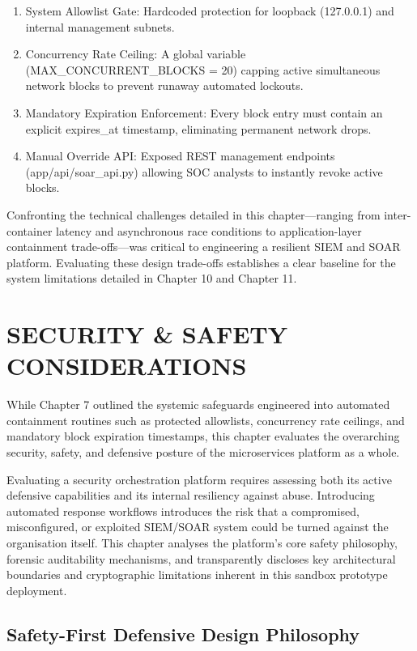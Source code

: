 \begin{enumerate}
  \item System Allowlist Gate: Hardcoded protection for loopback (127.0.0.1) and internal management subnets.
  \item Concurrency Rate Ceiling: A global variable (MAX\_CONCURRENT\_BLOCKS = 20) capping active simultaneous network blocks to prevent runaway automated lockouts.
  \item Mandatory Expiration Enforcement: Every block entry must contain an explicit expires\_at timestamp, eliminating permanent network drops.
  \item Manual Override API: Exposed REST management endpoints (app/api/soar\_api.py) allowing SOC analysts to instantly revoke active blocks.
\end{enumerate}

Confronting the technical challenges detailed in this chapter—ranging from inter-container latency and asynchronous race conditions to application-layer containment trade-offs—was critical to engineering a resilient SIEM and SOAR platform. Evaluating these design trade-offs establishes a clear baseline for the system limitations detailed in Chapter 10 and Chapter 11.

\newpage
\chapter{SECURITY \& SAFETY CONSIDERATIONS}

While Chapter 7 outlined the systemic safeguards engineered into automated containment routines such as protected allowlists, concurrency rate ceilings, and mandatory block expiration timestamps, this chapter evaluates the overarching security, safety, and defensive posture of the microservices platform as a whole.

Evaluating a security orchestration platform requires assessing both its active defensive capabilities and its internal resiliency against abuse. Introducing automated response workflows introduces the risk that a compromised, misconfigured, or exploited SIEM/SOAR system could be turned against the organisation itself. This chapter analyses the platform's core safety philosophy, forensic auditability mechanisms, and transparently discloses key architectural boundaries and cryptographic limitations inherent in this sandbox prototype deployment.

\section{Safety-First Defensive Design Philosophy}

